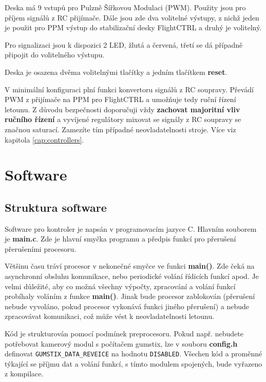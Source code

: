 \documentclass[11pt, a4paper]{article}
\begin{document}
Deska má 9 vstupů pro Pulzně Šířkovou Modulaci (PWM). Použity jsou pro příjem signálů z RC přijímače. Dále jsou zde dva volitelné výstupy, z nichž jeden je použit pro PPM výstup do stabilizační desky FlightCTRL a druhý je volitelný.

Pro signalizaci jsou k dispozici 2 LED, žlutá a červená, třetí se dá případně připojit do volitelného výstupu.

Deska je osazena dvěma volitelnými tlačítky a jedním tlačítkem \textbf{reset}.

V minimální konfiguraci plní funkci konvertoru signálů z RC soupravy. Převádí PWM z přijímače na PPM pro FlightCTRL a umožňuje tedy ruční řízení letounu. Z důvodu bezpečnosti doporučuji vždy \textbf{zachovat majoritní vliv ručního řízení} a vyvíjené regulátory mixovat se signály z RC soupravy se značnou saturací. Zamezíte tím případné neovladatelnosti stroje. Více viz kapitola \ref{cap:controllers}.

\newpage

\section{Software}

\subsection{Struktura software}

Software pro kontroler je napsán v programovacím jazyce C. Hlavním souborem je \textbf{main.c}. Zde je hlavní smyčka programu a předpis funkcí pro přerušení přerušeními procesoru.

Většinu času tráví procesor v nekonečné smyčce ve funkci \textbf{main()}. Zde čeká na asynchronní obsluhu komunikace, nebo periodické volání řídicích funkcí apod. Je velmi důležité, aby co možná všechny výpočty, zpracování a volání funkcí probíhaly voláním z funkce \textbf{main()}. Jinak bude procesor zablokován (přerušení nebude vyvoláno, pokud procesor vykonává funkci jiného přerušení) a nebude zpracovávat komunikaci, což může vést k neovladatelnosti letounu.

Kód je strukturován pomocí podmínek preprocesoru. Pokud např. nebudete potřebovat kamerový modul s počítačem gumstix, lze v souboru \textbf{config.h} definovat \texttt{GUMSTIX\_DATA\_REVEICE} na hodnotu \texttt{DISABLED}. Všechen kód a proměnné týkající se příjmu dat a volání funkcí, s tímto modulem spojených, bude vyřazeno z kompilace.
\end{document}
